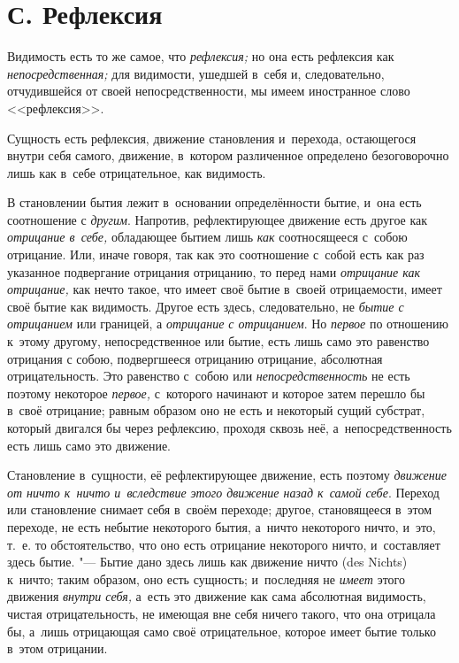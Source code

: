 \section[С. Рефлексия]{С. Рефлексия}
Видимость есть то же самое, что
{\em рефлексия;} но она есть рефлексия как
{\em непосредственная;} для видимости, ушедшей в~себя
и, следовательно, отчудившейся от своей непосредственности, мы имеем
иностранное слово <<рефлексия>>.

Сущность есть рефлексия, движение становления и~перехода, остающегося внутри
себя самого, движение, в~котором различенное определено безоговорочно лишь
как в~себе отрицательное, как видимость.

В становлении бытия лежит в~основании определённости бытие, и~она есть
соотношение с {\em другим}. Напротив, рефлектирующее
движение есть другое как {\em отрицание в~себе,}
обладающее бытием лишь {\em как} соотносящееся с~собою
отрицание. Или, иначе говоря, так как это соотношение с~собой есть как раз
указанное подвергание отрицания отрицанию, то перед нами
{\em отрицание как отрицание,} как нечто такое, что
имеет своё бытие в~своей отрицаемости, имеет своё бытие как видимость.
Другое есть здесь, следовательно, не {\em бытие с
отрицанием} или границей, а {\em отрицание с
отрицанием}. Но {\em первое} по отношению к~этому
другому, непосредственное или бытие, есть лишь само это равенство отрицания
с собою, подвергшееся отрицанию отрицание, абсолютная отрицательность. Это
равенство с~собою или {\em непосредственность} не есть
поэтому некоторое {\em первое,} с~которого начинают и
которое затем перешло бы в~своё отрицание; равным образом оно не есть и
некоторый сущий субстрат, который двигался бы через рефлексию, проходя
сквозь неё, а~непосредственность есть лишь само это движение.

Становление в~сущности, её рефлектирующее движение, есть поэтому
{\em движение от ничто к~ничто и~вследствие этого
движение назад к~самой себе}. Переход или становление снимает себя в~своём
переходе; другое, становящееся в~этом переходе, не есть небытие некоторого
бытия, а~ничто некоторого ничто, и~это, т.~е. то обстоятельство, что оно
есть отрицание некоторого ничто, и~составляет здесь бытие. "--- Бытие дано
здесь лишь как движение ничто (des Nichts) к~ничто; таким образом, оно есть
сущность; и~последняя не {\em имеет} этого движения
{\em внутри себя,} а~есть это движение как сама
абсолютная видимость, чистая отрицательность, не имеющая вне себя ничего
такого, что она отрицала бы, а~лишь отрицающая само своё отрицательное,
которое имеет бытие только в~этом отрицании.

